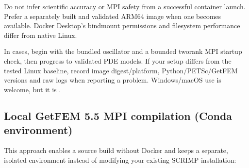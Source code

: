 \documentclass[letterpaper,10pt,english]{sphinxmanual}
\begin{document}
\sphinxAtStartPar
Do not infer scientific accuracy or MPI safety from a successful
container launch. Prefer a separately built and validated ARM64
image when one becomes available. Docker Desktop’s bind\sphinxhyphen{}mount
permissions and filesystem performance differ from native Linux.

\sphinxAtStartPar
In  cases, begin with the bundled oscillator and a bounded
two\sphinxhyphen{}rank MPI start\sphinxhyphen{}up check, then progress to validated PDE models.
If your setup differs from the tested Linux baseline, record image
digest/platform, Python/PETSc/GetFEM versions and raw logs when
reporting a problem. Windows/macOS use is welcome, but it is
.


\subsection{Local GetFEM 5.5 MPI compilation (Conda environment)}
\label{\detokenize{install:local-getfem-5-5-mpi-compilation-conda-environment}}
\sphinxAtStartPar
This approach enables a source build without Docker and keeps a
separate, isolated environment instead of modifying your existing
SCRIMP installation:
\end{document}
